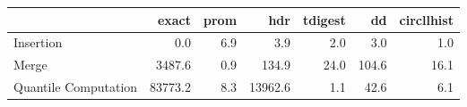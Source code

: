 \begin{tabular}{lrrrrrr}
\toprule
{} &   exact &  prom &     hdr &  tdigest &    dd &  circllhist \\
\midrule
Insertion            &     0.0 &   6.9 &     3.9 &      2.0 &   3.0 &         1.0 \\
Merge                &  3487.6 &   0.9 &   134.9 &     24.0 & 104.6 &        16.1 \\
Quantile Computation & 83773.2 &   8.3 & 13962.6 &      1.1 &  42.6 &         6.1 \\
\bottomrule
\end{tabular}
